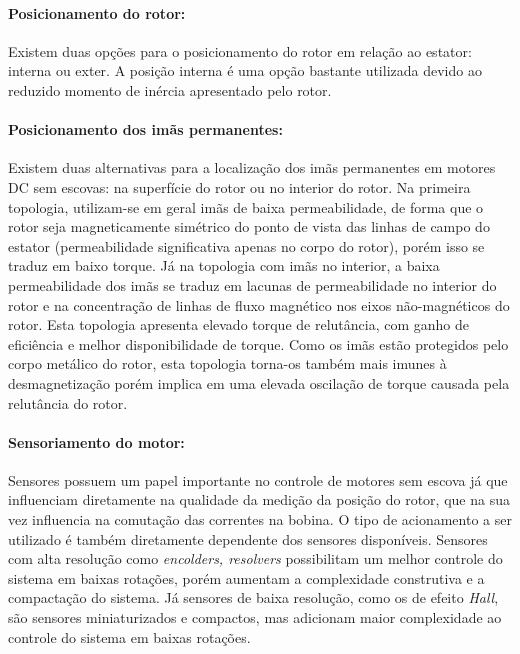 \paragraph{Posicionamento do rotor:}\label{sec:motor:posicionamento}

Existem duas opções para o posicionamento do rotor em relação ao estator: interna ou exter. A posição interna é uma opção bastante utilizada devido ao reduzido momento de inércia apresentado pelo rotor.

\paragraph{Posicionamento dos imãs permanentes:}\label{sec:motor:Imãs}

Existem duas alternativas para a localização dos imãs permanentes em motores DC sem escovas: na superfície do rotor ou no interior do rotor. Na primeira topologia, utilizam-se em geral imãs de baixa permeabilidade, de forma que o rotor seja magneticamente simétrico do ponto de vista das linhas de campo do estator (permeabilidade significativa apenas no corpo do rotor), porém isso se traduz em baixo torque. Já na topologia com imãs no interior, a baixa permeabilidade dos imãs se traduz em lacunas de permeabilidade
no interior do rotor e na concentração de linhas de fluxo magnético nos eixos não-magnéticos do rotor. Esta topologia apresenta elevado torque de relutância, com ganho de eficiência e melhor disponibilidade de torque. Como os imãs estão protegidos pelo corpo metálico do rotor, esta topologia torna-os também mais imunes à desmagnetização porém implica em uma elevada oscilação de torque causada pela relutância do rotor.

\paragraph{Sensoriamento do motor:}\label{sec:motor:sensoriamento}
	
Sensores possuem um papel importante no controle de motores sem escova já que influenciam diretamente na qualidade da medição da posição do rotor, que na sua vez influencia na comutação das correntes na bobina. O tipo de acionamento a ser utilizado é também diretamente dependente dos sensores disponíveis. Sensores com alta resolução como \textit{encolders, resolvers} possibilitam um melhor controle do sistema em baixas rotações, porém aumentam a complexidade construtiva e a compactação do sistema. Já sensores de baixa resolução, como os de efeito \textit{Hall}, são sensores miniaturizados e compactos, mas adicionam maior complexidade ao controle do sistema em baixas rotações.	

